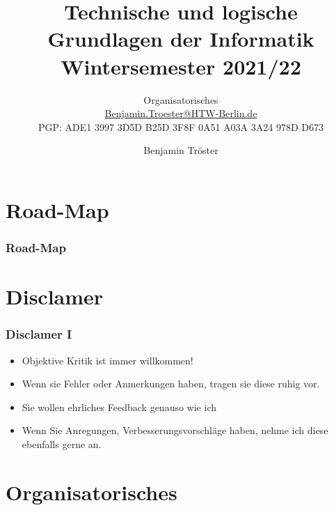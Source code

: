 \documentclass[xcolor=dvipsnames,aspectratio=169]{beamer}
\begin{document}

\title{Technische und logische Grundlagen der Informatik\\Wintersemester 2021/22}
\subtitle{Organisatorisches\\

\href{mailto:Benjamin.Troester@HTW-Berlin.de}{Benjamin.Troester@HTW-Berlin.de}\\
		PGP: ADE1 3997 3D5D B25D 3F8F 0A51 A03A 3A24 978D D673 }

\author{Benjamin Tröster}

\date{}

\begin{frame}
\titlepage
\end{frame}

\section*{Road-Map}
\begin{frame}
\frametitle{Road-Map}
\begin{multicols}{2}
  \tableofcontents
\end{multicols}
\end{frame}

\section{Disclamer}
\begin{frame}
	\frametitle{Disclamer I}
	\begin{itemize}
		\item Objektive Kritik ist immer willkommen!
		\item Wenn sie Fehler oder Anmerkungen haben, tragen sie diese ruhig vor.
		\item Sie wollen ehrliches Feedback genauso wie ich
		\item Wenn Sie Anregungen, Verbesserungsvorschläge haben, nehme ich diese ebenfalls gerne an.
	\end{itemize}
\end{frame}

\section{Organisatorisches}
\end{document}
